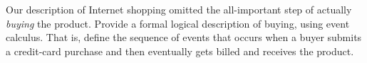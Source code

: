 \begin{exercise}%
Our description of Internet shopping omitted the all-important step of
actually {\em buying} the product.  Provide a formal logical
description of buying, using event calculus.  That is, define the
sequence of events that occurs when a buyer submits a credit-card
purchase and then eventually gets billed and receives the product.
\end{exercise} 












